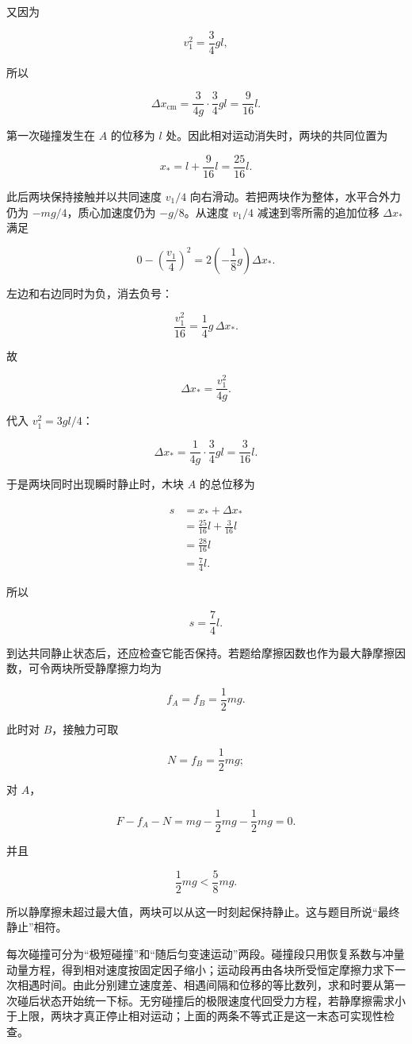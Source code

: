 \documentclass[12pt,a4paper,UTF8]{ctexart}
\begin{document}
又因为

\[v_1^2=\frac34gl,\]

所以

\[\Delta x_{\mathrm{cm}}
=\frac{3}{4g}\cdot\frac34gl
=\frac9{16}l.\]

第一次碰撞发生在 \(A\) 的位移为 \(l\)
处。因此相对运动消失时，两块的共同位置为

\[x_*=
l+\frac9{16}l
=\frac{25}{16}l.\]

此后两块保持接触并以共同速度 \(v_1/4\)
向右滑动。若把两块作为整体，水平合外力仍为 \(-mg/4\)，质心加速度仍为
\(-g/8\)。从速度 \(v_1/4\) 减速到零所需的追加位移 \(\Delta x_*\) 满足

\[0-\left(\frac{v_1}{4}\right)^2
=2\left(-\frac18g\right)\Delta x_*.\]

左边和右边同时为负，消去负号：

\[\frac{v_1^2}{16}=\frac14g\,\Delta x_*.\]

故

\[\Delta x_*=\frac{v_1^2}{4g}.\]

代入 \(v_1^2=3gl/4\)：

\[\Delta x_*=
\frac{1}{4g}\cdot\frac34gl
=\frac3{16}l.\]

于是两块同时出现瞬时静止时，木块 \(A\) 的总位移为

\[\begin{aligned}
s
&=x_*+\Delta x_*\\
&=\frac{25}{16}l+\frac3{16}l\\
&=\frac{28}{16}l\\
&=\frac74l.
\end{aligned}\]

所以

\[\boxed{s=\frac74l}.\]

到达共同静止状态后，还应检查它能否保持。若题给摩擦因数也作为最大静摩擦因数，可令两块所受静摩擦力均为

\[f_A=f_B=\frac12mg.\]

此时对 \(B\)，接触力可取

\[N=f_B=\frac12mg;\]

对 \(A\)，

\[F-f_A-N
=mg-\frac12mg-\frac12mg=0.\]

并且

\[\frac12mg<\frac58mg.\]

所以静摩擦未超过最大值，两块可以从这一时刻起保持静止。这与题目所说``最终静止''相符。

每次碰撞可分为``极短碰撞''和``随后匀变速运动''两段。碰撞段只用恢复系数与冲量动量方程，得到相对速度按固定因子缩小；运动段再由各块所受恒定摩擦力求下一次相遇时间。由此分别建立速度差、相遇间隔和位移的等比数列，求和时要从第一次碰后状态开始统一下标。无穷碰撞后的极限速度代回受力方程，若静摩擦需求小于上限，两块才真正停止相对运动；上面的两条不等式正是这一末态可实现性检查。
\end{document}
